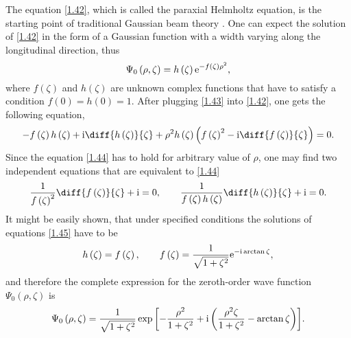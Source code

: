 The equation \ref{1.42}, which is called the paraxial Helmholtz equation, is the starting point of traditional Gaussian beam theory \cite{Davis1979}. One can expect the solution of \ref{1.42} in the form of a Gaussian function with a width varying along the longitudinal direction, thus 
\begin{equation}
\label{1.43}
\Psi_0 \left(\rho, \zeta \right) = h\left(\zeta \right)\mathrm{e}^{-f\left(\zeta \right) \rho^2},
\end{equation}
where $ f\left(\zeta \right) $ and $ h\left(\zeta \right) $ are unknown complex functions that have to satisfy a condition $ f\left(0 \right) = h\left(0 \right) = 1 $. After plugging \ref{1.43} into \ref{1.42}, one gets the following equation,
\begin{equation}
\label{1.44}
-f\left(\zeta \right) h\left(\zeta \right) + \i \diff{h\left(\zeta \right)}{\zeta} + \rho^2 h\left(\zeta \right) \left(f\left(\zeta \right)^2 - \i \diff{f\left(\zeta \right)}{\zeta} \right) = 0.
\end{equation}
Since the equation \ref{1.44} has to hold for arbitrary value of $ \rho $, one may find two independent equations that are equivalent to \ref{1.44}
\begin{equation}
\label{1.45}
\frac{1}{f\left(\zeta \right)^2} \diff{f\left(\zeta \right)}{\zeta} + \i = 0, \qquad \frac{1}{f\left(\zeta \right) h\left(\zeta \right)} \diff{h\left(\zeta \right)}{\zeta} + \i = 0.
\end{equation}
It might be easily shown, that under specified conditions the solutions of equations \ref{1.45} have to be
\begin{equation}
\label{1.46}
h\left(\zeta \right) = f\left(\zeta \right), \qquad f\left(\zeta \right) = \frac{1}{\sqrt{1 + \zeta^2}} \mathrm{e}^{-\mathrm{i} \arctan{\zeta}},
\end{equation}
and therefore the complete expression for the zeroth-order wave function $ \Psi_0 \left(\rho, \zeta \right) $ is
\begin{equation}
\label{1.47}
\Psi_0 \left(\rho, \zeta \right) = \frac{1}{\sqrt{1 + \zeta^2}} \exp{\left[- \frac{\rho^2}{1 + \zeta^2} + \mathrm{i}\left(\frac{\rho^2 \zeta}{1 + \zeta^2} - \arctan{\zeta} \right) \right]}.
\end{equation}

